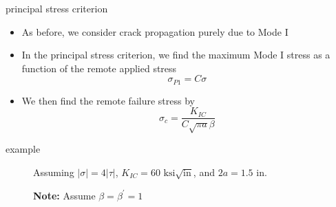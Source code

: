 \documentclass[10pt]{beamer}
\begin{document}
\begin{frame}{principal stress criterion}
	\begin{itemize}[<+->]
		\item As before, we consider crack propagation purely due to Mode I
		\item In the principal stress criterion, we find the maximum Mode I stress as a function of the remote applied stress
		\begin{equation}
		\sigma_{P1} = C \sigma
		\end{equation}
		\item We then find the remote failure stress by
		\begin{equation}
		\sigma_c = \frac{K_{IC}}{C\sqrt{\pi a}\beta}
		\end{equation}
	\end{itemize}
\end{frame}

\begin{frame}{example}
	\begin{figure}[H]
		Assuming $|\sigma| = 4|\tau|$, $K_{IC} = 60 \text{ ksi} \sqrt{\text{in}}$, and $2a = 1.5 \text{ in}$.
		
		\textbf{Note:} Assume $\beta = \beta^\prime = 1$
		
		\centering
	\end{figure}
\end{frame}
\end{document}

